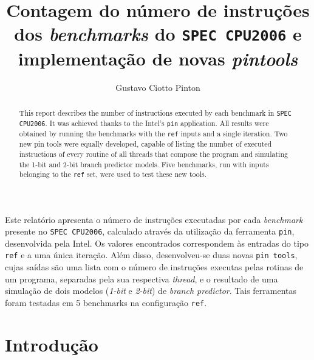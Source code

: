 \documentclass[12pt]{article}
\title{Contagem do número de instruções dos \textit{benchmarks} do
\texttt{SPEC CPU2006} e implementação de novas \textit{pintools}}
\author{Gustavo Ciotto Pinton\inst{1} }
\begin{document}
 

\maketitle

\begin{abstract}
This report describes the number of instructions executed by each
benchmark in \texttt{SPEC CPU2006}. It was achieved thanks to the
Intel's \texttt{pin} application. All results were obtained by running the
benchmarks with the \texttt{ref} inputs and a single iteration. Two new
pin tools were equally developed, capable of listing the number of executed
instructions of every routine of all threads that compose the program and
simulating the 1-bit and 2-bit branch predictor models. Five benchmarks, run
with inputs belonging to the \texttt{ref} set, were used to test these new
tools.
\end{abstract}
     
\begin{resumo} 
Este relatório apresenta o número de instruções executadas por cada
\textit{benchmark} presente no \texttt{SPEC CPU2006}, calculado através da
utilização da ferramenta \texttt{pin}, desenvolvida pela Intel. Os valores
encontrados correspondem às entradas do tipo \texttt{ref} e a uma única
iteração. Além disso, desenvolveu-se duas novas \texttt{pin tools}, cujas saídas
são uma lista com o número de instruções executas pelas rotinas de um
programa, separadas pela sua respectiva \textit{thread}, e o resultado de uma
simulação de dois modelos (\textit{1-bit} e \textit{2-bit}) de \textit{branch
predictor}. Tais ferramentas foram testadas em 5 benchmarks na configuração
\texttt{ref}.
\end{resumo}


\section{Introdução}
\end{document}
